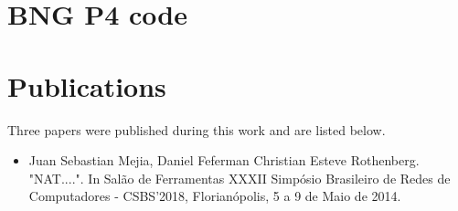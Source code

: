 \textual









%


\postextual




%
%
%
%
%


\begin{anexosenv}

\partanexos

\chapter{BNG P4 code}
\label{annex:p4code}

  


\chapter{Publications}
\label{AnnexB}
Three papers were published during this work and are listed below. 

\begin{itemize}

    \item Juan Sebastian Mejia, Daniel Feferman Christian Esteve Rothenberg. "NAT....". In Salão de Ferramentas XXXII Simpósio Brasileiro de Redes de Computadores - CSBS'2018, Florianópolis, 5 a 9 de Maio de 2014.

\end{itemize}

\end{anexosenv}


\printindex

 